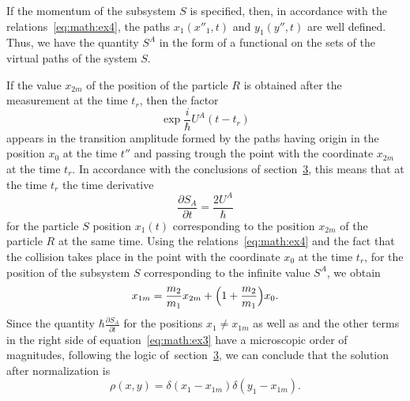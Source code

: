 If the momentum of the subsystem $S$ is specified, then, in accordance with the relations~\eqref{eq:math:ex4}, the paths $x_1(x''_1,t)$ and $y_1(y'',t)$ are well defined. Thus, we have the quantity $S^A$ in the form of a functional on the sets of the virtual paths of the system $S$.

If the value $x_{2m}$ of the position of the particle $R$ is obtained after the measurement at the time $t_r$, then the factor
\begin{equation*}
\exp\frac{i}{\hbar}U^A(t-t_r)
\end{equation*}
appears in the transition amplitude formed by the paths having origin in the position $x_0$ at the time $t''$ and passing trough the point with the coordinate $x_{2m}$ at the time $t_r$. 
In accordance with the conclusions of section~\hyperlink{sama:l1}{3}, this means that at the time $t_r$ the time derivative  
\begin{equation*}
\frac{\partial S_A}{\partial t}=\frac{2U^A}{\hbar}
\end{equation*}
for the particle $S$ position $x_1(t)$ corresponding to the position $x_{2m}$ of the particle $R$ at the same time.  Using the relations~\eqref{eq:math:ex4} and the fact that the collision takes place in the point with the coordinate $x_0$ at the time $t_r$, for the position of the subsystem $S$ corresponding to the infinite value $S^A$, we obtain 
\begin{equation*}
x_{1m}=\frac{m_2}{m_1}x_{2m}+\Bigl(1+\frac{m_2}{m_1}\Bigr)x_0.
\end{equation*}
Since the quantity $\hbar\frac{\partial S_A}{\partial t}$ for the positions $x_1\neq x_{1m}$ as well as and the other terms in the right side of equation~\eqref{eq:math:ex3} have a microscopic order of magnitudes, following the logic of~section~\hyperlink{sama:l1}{3}, we can conclude that the solution after normalization is 
\begin{equation*}
\rho(x,y)=\delta(x_1-x_{1m})\delta(y_1-x_{1m}).
\end{equation*}

